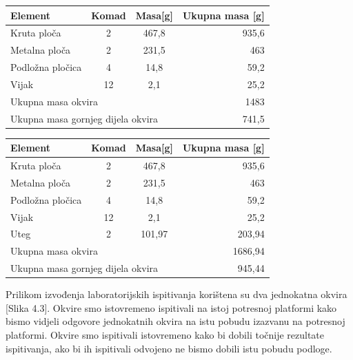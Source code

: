 \documentclass[12pt]{book}
\begin{document}
\begin{table}
	\begin{center}
		\begin{tabular}{|l|c|c|r|}
			\hline
			Element & Komad & Masa[g] & Ukupna masa [g]\\
			\hline
			Kruta ploča & 2 & 467,8 & 935,6\\
			\hline
			Metalna ploča & 2 & 231,5 & 463\\
			\hline
			Podložna pločica & 4 & 14,8 & 59,2 \\
			\hline
			Vijak & 12 & 2,1 & 25,2\\
			\hline
			\multicolumn{3}{|l|}{Ukupna masa okvira} & 1483\\
			\hline
			\multicolumn{3}{|l|}{Ukupna masa gornjeg dijela okvira} & 741,5\\
			\hline
		\end{tabular}
	\end{center}
\end{table}


\begin{table}
	\begin{center}
		\begin{tabular}{|l|c|c|r|}
			\hline
			Element & Komad & Masa[g] & Ukupna masa [g]\\
			\hline
			Kruta ploča & 2 & 467,8 & 935,6\\
			\hline
			Metalna ploča & 2 & 231,5 & 463\\
			\hline
			Podložna pločica & 4 & 14,8 & 59,2 \\
			\hline
			Vijak & 12 & 2,1 & 25,2\\
			\hline
			Uteg & 2 & 101,97 & 203,94\\
			\hline
			\multicolumn{3}{|l|}{Ukupna masa okvira} & 1686,94\\
			\hline
			\multicolumn{3}{|l|}{Ukupna masa gornjeg dijela okvira} & 945,44\\
			\hline
		\end{tabular}
	\end{center}
\end{table}

Prilikom izvođenja laboratorijskih ispitivanja korištena su dva jednokatna okvira [Slika 4.3]. Okvire smo istovremeno ispitivali na istoj potresnoj platformi kako bismo vidjeli odgovore jednokatnih okvira na istu pobudu izazvanu na potresnoj platformi. Okvire smo ispitivali istovremeno kako bi dobili točnije rezultate ispitivanja, ako bi ih ispitivali odvojeno ne bismo dobili istu pobudu podloge.
\end{document}
